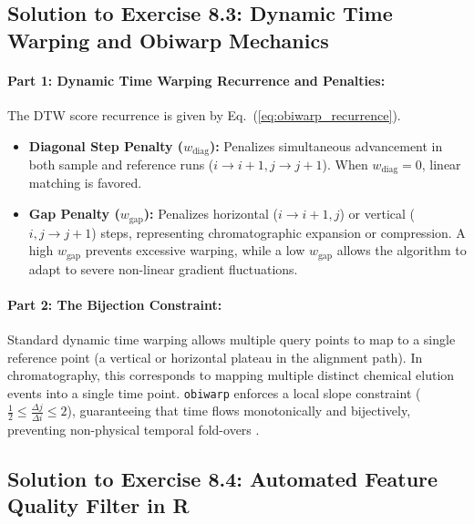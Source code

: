 \documentclass[11pt,twoside,openright]{book}
\begin{document}
\subsection*{Solution to Exercise 8.3: Dynamic Time Warping and Obiwarp Mechanics}

\paragraph{Part 1: Dynamic Time Warping Recurrence and Penalties:}
The DTW score recurrence is given by Eq.~(\ref{eq:obiwarp_recurrence}).
\begin{itemize}
    \item \textbf{Diagonal Step Penalty ($w_{\text{diag}}$):} Penalizes simultaneous advancement in both sample and reference runs ($i \to i+1, j \to j+1$). When $w_{\text{diag}} = 0$, linear matching is favored.
    \item \textbf{Gap Penalty ($w_{\text{gap}}$):} Penalizes horizontal ($i \to i+1, j$) or vertical ($i, j \to j+1$) steps, representing chromatographic expansion or compression. A high $w_{\text{gap}}$ prevents excessive warping, while a low $w_{\text{gap}}$ allows the algorithm to adapt to severe non-linear gradient fluctuations.
\end{itemize}

\paragraph{Part 2: The Bijection Constraint:}
Standard dynamic time warping allows multiple query points to map to a single reference point (a vertical or horizontal plateau in the alignment path). In chromatography, this corresponds to mapping multiple distinct chemical elution events into a single time point. \texttt{obiwarp} enforces a local slope constraint ($\frac{1}{2} \le \frac{\Delta j}{\Delta i} \le 2$), guaranteeing that time flows monotonically and bijectively, preventing non-physical temporal fold-overs \cite{prince2006chromatographic}.

\subsection*{Solution to Exercise 8.4: Automated Feature Quality Filter in R}
\end{document}
